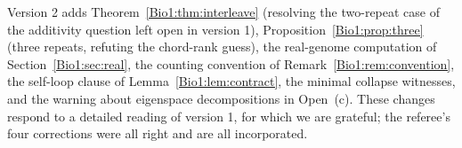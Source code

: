 Version 2 adds Theorem~\ref{Bio1:thm:interleave} (resolving the two-repeat case of the
additivity question left open in version 1), Proposition~\ref{Bio1:prop:three} (three repeats,
refuting the chord-rank guess), the real-genome computation of
Section~\ref{Bio1:sec:real}, the counting convention of Remark~\ref{Bio1:rem:convention}, the
self-loop clause of Lemma~\ref{Bio1:lem:contract}, the minimal collapse witnesses, and the
warning about eigenspace decompositions in Open~(c). These changes respond to a detailed
reading of version 1, for which we are grateful; the referee's four corrections were all
right and are all incorporated.

